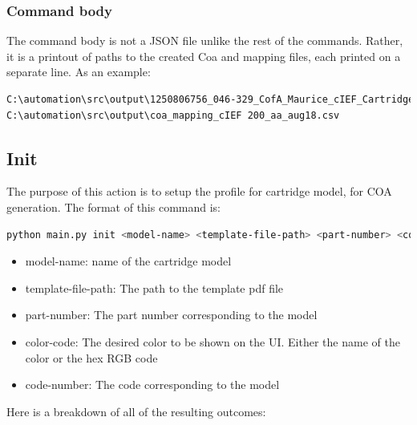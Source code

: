 \documentclass[12pt,a4paper]{article}
\begin{document}
\subsubsection{Command body}
The command body is not a JSON file unlike the rest of the commands. Rather, it is a printout of paths to the created Coa and mapping files, each printed 
on a separate line. As an example:
\begin{lstlisting}[language=bash]
C:\automation\src\output\1250806756_046-329_CofA_Maurice_cIEF_Cartridge_090-101_RevF.pdf
C:\automation\src\output\coa_mapping_cIEF 200_aa_aug18.csv
\end{lstlisting}
\subsection{Init}
The purpose of this action is to setup the profile for cartridge model, for COA generation. The format of this command is:
\begin{lstlisting}[language=bash]
  python main.py init <model-name> <template-file-path> <part-number> <color-code> <code-number>
\end{lstlisting}
\begin{itemize}
  \item model-name: name of the cartridge model
  \item template-file-path: The path to the template pdf file
  \item part-number: The part number corresponding to the model
  \item color-code: The desired color to be shown on the UI. Either the name of the color or the hex RGB code 
  \item code-number: The code corresponding to the model
\end{itemize}
Here is a breakdown of all of the resulting outcomes:
\end{document}
